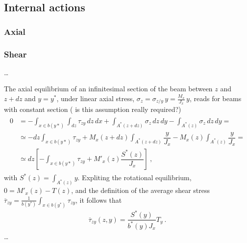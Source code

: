 \documentclass[letterpaper,10pt,english]{jupyterBook}
\begin{document}
\subsection{Internal actions}
\label{\detokenize{ch/solids/beams/de-saint-venant:internal-actions}}\label{\detokenize{ch/solids/beams/de-saint-venant:solid-mechanics-small-displacements-beams-de-saint-venant-internal-actions}}

\subsubsection{Axial}
\label{\detokenize{ch/solids/beams/de-saint-venant:axial}}\label{\detokenize{ch/solids/beams/de-saint-venant:solid-mechanics-small-displacements-beams-de-saint-venant-internal-actions-axial}}

\subsubsection{Shear}
\label{\detokenize{ch/solids/beams/de-saint-venant:shear}}\label{\detokenize{ch/solids/beams/de-saint-venant:solid-mechanics-small-displacements-beams-de-saint-venant-internal-actions-shear}}
\sphinxAtStartPar
…

\sphinxAtStartPar
The axial equilibrium of an infinitesimal section of the beam between \(z\) and \(z+dz\) and \(y = y^*\), under linear axial stress, \(\sigma_z = \sigma_{z/y} \, y = \frac{M_x}{J_x} \, y\), reads for beams with constant section ( is this assumption really required?)
\begin{equation*}
\begin{split}\begin{aligned}
  0 
  & = - \int_{x \in b(y*)} \int_{dz} \tau_{zy} \, dz \, dx + \int_{A^*(z+dz)} \sigma_z \, dz \, dy - \int_{A^*(z)} \sigma_z \, dz \, dy = \\
  & \simeq - dz \int_{x \in b(y*)} \tau_{zy} + M_x(z+dz) \int_{A^*(z+dz)} \dfrac{y}{J_x} - M_x(z) \int_{A^*(z)} \dfrac{y}{J_x} = \\
  & \simeq dz \left[ - \int_{x \in b(y*)} \tau_{zy} + M'_x(z) \dfrac{S^*(z)}{J_x} \right] \ ,
\end{aligned}\end{split}
\end{equation*}
\sphinxAtStartPar
with \(S^*(z) = \int_{A^*(z)} y\). Expliting the rotational equilibrium, \(0 = M'_x(z) - T(z)\), and the definition of the average shear stress \(\overline{\tau}_{zy} = \frac{1}{b(y^*)} \int_{x \in b(y^*)} \tau_{zy}\), it follows that
\begin{equation*}
\begin{split}\overline{\tau}_{zy}(z,y) = \dfrac{S^*(y)}{b^*(y) J_x} T_y \ .\end{split}
\end{equation*}
\sphinxAtStartPar
…
\end{document}
